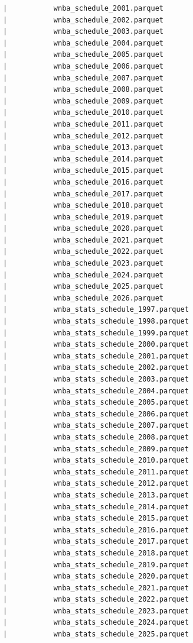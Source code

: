 \begin{lstlisting}
      |           wnba_schedule_2001.parquet
      |           wnba_schedule_2002.parquet
      |           wnba_schedule_2003.parquet
      |           wnba_schedule_2004.parquet
      |           wnba_schedule_2005.parquet
      |           wnba_schedule_2006.parquet
      |           wnba_schedule_2007.parquet
      |           wnba_schedule_2008.parquet
      |           wnba_schedule_2009.parquet
      |           wnba_schedule_2010.parquet
      |           wnba_schedule_2011.parquet
      |           wnba_schedule_2012.parquet
      |           wnba_schedule_2013.parquet
      |           wnba_schedule_2014.parquet
      |           wnba_schedule_2015.parquet
      |           wnba_schedule_2016.parquet
      |           wnba_schedule_2017.parquet
      |           wnba_schedule_2018.parquet
      |           wnba_schedule_2019.parquet
      |           wnba_schedule_2020.parquet
      |           wnba_schedule_2021.parquet
      |           wnba_schedule_2022.parquet
      |           wnba_schedule_2023.parquet
      |           wnba_schedule_2024.parquet
      |           wnba_schedule_2025.parquet
      |           wnba_schedule_2026.parquet
      |           wnba_stats_schedule_1997.parquet
      |           wnba_stats_schedule_1998.parquet
      |           wnba_stats_schedule_1999.parquet
      |           wnba_stats_schedule_2000.parquet
      |           wnba_stats_schedule_2001.parquet
      |           wnba_stats_schedule_2002.parquet
      |           wnba_stats_schedule_2003.parquet
      |           wnba_stats_schedule_2004.parquet
      |           wnba_stats_schedule_2005.parquet
      |           wnba_stats_schedule_2006.parquet
      |           wnba_stats_schedule_2007.parquet
      |           wnba_stats_schedule_2008.parquet
      |           wnba_stats_schedule_2009.parquet
      |           wnba_stats_schedule_2010.parquet
      |           wnba_stats_schedule_2011.parquet
      |           wnba_stats_schedule_2012.parquet
      |           wnba_stats_schedule_2013.parquet
      |           wnba_stats_schedule_2014.parquet
      |           wnba_stats_schedule_2015.parquet
      |           wnba_stats_schedule_2016.parquet
      |           wnba_stats_schedule_2017.parquet
      |           wnba_stats_schedule_2018.parquet
      |           wnba_stats_schedule_2019.parquet
      |           wnba_stats_schedule_2020.parquet
      |           wnba_stats_schedule_2021.parquet
      |           wnba_stats_schedule_2022.parquet
      |           wnba_stats_schedule_2023.parquet
      |           wnba_stats_schedule_2024.parquet
      |           wnba_stats_schedule_2025.parquet

\end{lstlisting}
